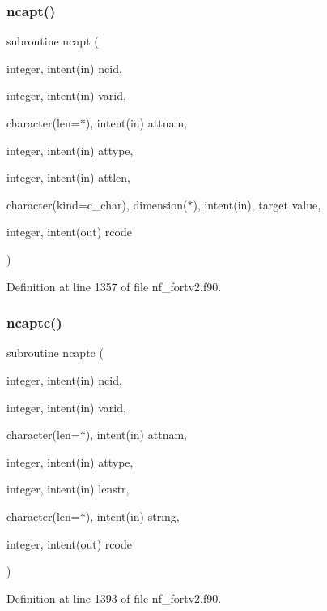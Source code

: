 \subsubsection{\texorpdfstring{ncapt()}{ncapt()}}
{\footnotesize\ttfamily subroutine ncapt (\begin{DoxyParamCaption}\item[{integer, intent(in)}]{ncid,  }\item[{integer, intent(in)}]{varid,  }\item[{character(len=$\ast$), intent(in)}]{attnam,  }\item[{integer, intent(in)}]{attype,  }\item[{integer, intent(in)}]{attlen,  }\item[{character(kind=c\+\_\+char), dimension($\ast$), intent(in), target}]{value,  }\item[{integer, intent(out)}]{rcode }\end{DoxyParamCaption})}



Definition at line 1357 of file nf\+\_\+fortv2.\+f90.

\mbox{\label{nf__fortv2_8f90_a525301fbfb8b1e885e1531ed31e16565}} 
\subsubsection{\texorpdfstring{ncaptc()}{ncaptc()}}
{\footnotesize\ttfamily subroutine ncaptc (\begin{DoxyParamCaption}\item[{integer, intent(in)}]{ncid,  }\item[{integer, intent(in)}]{varid,  }\item[{character(len=$\ast$), intent(in)}]{attnam,  }\item[{integer, intent(in)}]{attype,  }\item[{integer, intent(in)}]{lenstr,  }\item[{character(len=$\ast$), intent(in)}]{string,  }\item[{integer, intent(out)}]{rcode }\end{DoxyParamCaption})}



Definition at line 1393 of file nf\+\_\+fortv2.\+f90.

\mbox{\label{nf__fortv2_8f90_ab82f351050b86a1f5c96a8ef0f5fd46c}} 

